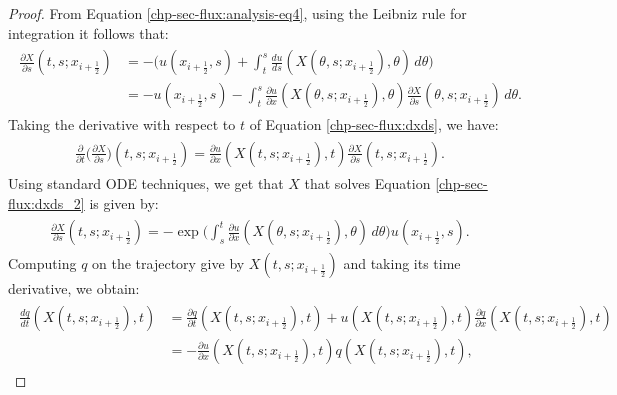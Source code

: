 \begin{proof}
From Equation \eqref{chp-sec-flux:analysis-eq4}, using the Leibniz rule for integration it follows that:
\begin{align}
	\begin{split}
		\label{chp-sec-flux:dxds}
		\frac{\partial X}{\partial s} (t,s;x_{i+\frac{1}{2}}) &= - \bigg(u(x_{i+\frac{1}{2}},s) + 
		\int_{t}^{s} \frac{du}{ds}(X(\theta,s;x_{i+\frac{1}{2}}),\theta) \,d\theta \bigg)\\
		&=- u(x_{i+\frac{1}{2}},s) -
		\int_{t}^{s} \frac{\partial u}{\partial x}(X(\theta, s; x_{i+\frac{1}{2}}),\theta) 
		\frac{\partial X}{\partial s} (\theta, s; x_{i+\frac{1}{2}})\,d\theta.
	\end{split}
\end{align}
Taking the derivative with respect to $t$ of Equation \eqref{chp-sec-flux:dxds}, we have:
\begin{align}
	\begin{split}
		\label{chp-sec-flux:dxds_2}
		\frac{\partial }{\partial t} \bigg(\frac{\partial X}{\partial s} \bigg)
		(t,s;x_{i+\frac{1}{2}}) = \frac{\partial u}{\partial x}(X(t, s; x_{i+\frac{1}{2}}), t) 
		\frac{\partial X}{\partial s} (t, s; x_{i+\frac{1}{2}}).
	\end{split}
\end{align}
Using standard ODE techniques, we get that $X$ that solves Equation \eqref{chp-sec-flux:dxds_2}
is given by:
\begin{align}
	\begin{split}
		\label{chp-sec-flux:xs_int}
		\frac{\partial X}{\partial s}(t,s;x_{i+\frac{1}{2}}) = 
		-\exp{\bigg( \int_{s}^{t} \frac{\partial u}{\partial x}(X(\theta,s;x_{i+\frac{1}{2}}),\theta)  \,d\theta \bigg)}
	  u(x_{i+\frac{1}{2}},s).
	\end{split}
\end{align}
Computing $q$ on the trajectory give by $X(t,s;x_{i+\frac{1}{2}})$ and taking
its time derivative, we obtain:
\begin{align}
	\label{chp-sec-flux:dqdt}
	\begin{split}
		\frac{dq}{dt} (X(t,s;x_{i+\frac{1}{2}}),t) &= 
		\frac{\partial q}{\partial t} (X(t,s;x_{i+\frac{1}{2}}),t)+
		u (X(t,s;x_{i+\frac{1}{2}}),t)\frac{\partial q}{\partial x} (X(t,s;x_{i+\frac{1}{2}}),t) \\
		&= -\frac{\partial u}{\partial x}(X(t,s;x_{i+\frac{1}{2}}),t)  q (X(t,s;x_{i+\frac{1}{2}}),t),
	\end{split}
\end{align}

\end{proof}
